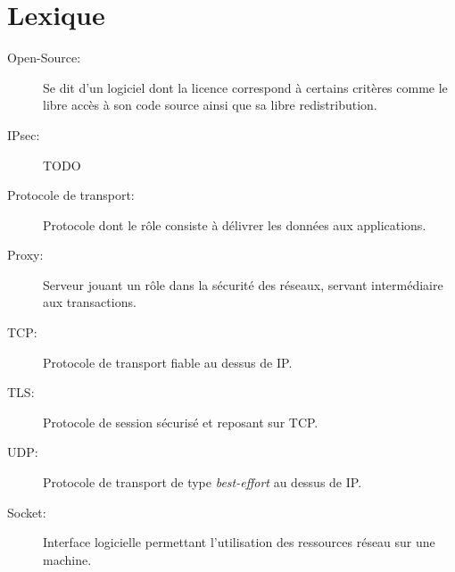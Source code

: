 \section*{Lexique}

\begin{description}
	\item [Open-Source:] Se dit d'un logiciel dont la licence correspond à certains critères comme le libre accès à son code source ainsi que sa libre redistribution.
	\item [IPsec:] TODO
	\item [Protocole de transport:] Protocole dont le rôle consiste à délivrer les données aux applications.
	\item [Proxy:] Serveur jouant un rôle dans la sécurité des réseaux, servant intermédiaire aux transactions.
	\item [TCP:] Protocole de transport fiable au dessus de IP.
	\item [TLS:] Protocole de session sécurisé et reposant sur TCP.
	\item [UDP:] Protocole de transport de type \textit{best-effort} au dessus de IP.
	\item [Socket:] Interface logicielle permettant l'utilisation des ressources réseau sur une machine.
\end{description}

\pagebreak